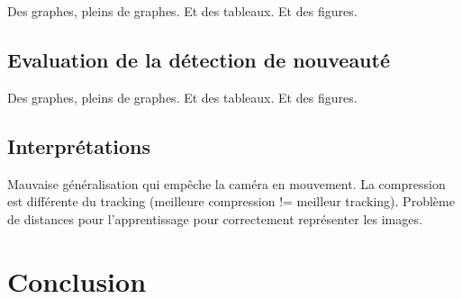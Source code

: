 	Des graphes, pleins de graphes. Et des tableaux. Et des figures.

	\subsection{Evaluation de la détection de nouveauté}
	
	Des graphes, pleins de graphes. Et des tableaux. Et des figures.

	\subsection{Interprétations}

	Mauvaise généralisation qui empêche la caméra en mouvement. La compression est différente du tracking (meilleure compression != meilleur tracking). Problème de distances pour l'apprentissage pour correctement représenter les images.

	\section{Conclusion}
		

